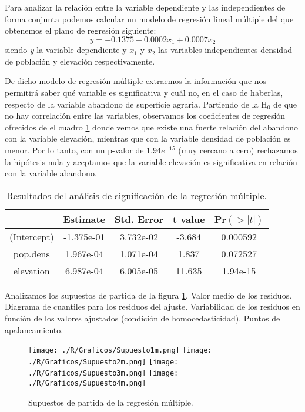 \documentclass[11pt,a4paper]{article}
\begin{document}
Para analizar la relación entre la variable dependiente y las independientes de forma conjunta podemos calcular un modelo de regresión lineal múltiple del que obtenemos el plano de regresión siguiente:
\begin{equation}
y=-0.1375+0.0002x_{1}+0.0007x_{2}
\label{eq:regre.multi}
\end{equation}
\noindent siendo \textit{y} la variable dependiente y $x_{1}$ y $x_2$ las variables independientes densidad de población y elevación respectivamente.

De dicho modelo de regresión múltiple extraemos la información que nos permitirá saber qué variable es significativa y cuál no, en el caso de haberlas, respecto de la variable abandono de superficie agraria. Partiendo de la H$_0$ de que no hay correlación entre las variables, observamos los coeficientes de regresión ofrecidos de el cuadro \ref{tab:coef.multi} donde vemos que existe una fuerte relación del abandono con la variable elevación, mientras que con la variable densidad de población es menor. Por lo tanto, con un p-valor de $1.94e^{-15}$ (muy cercano a cero) rechazamos la hipótesis nula y aceptamos que la variable elevación es significativa en relación con la variable abandono.

\begin{table}[ht]
\centering
\begin{tabular}{ccccc}
\toprule[0.4mm]
& Estimate & Std. Error & t value & Pr$(>|t|)$\\
\midrule
(Intercept) & -1.375e-01 & 3.732e-02 & -3.684 & 0.000592\\
pop.dens & 1.967e-04 & 1.071e-04 & 1.837 & 0.072527\\
elevation & 6.987e-04 & 6.005e-05 & 11.635 & 1.94e-15\\
\bottomrule[0.4mm]
\end{tabular}
\caption{Resultados del análisis de significación de la regresión múltiple.}
\label{tab:coef.multi}
\end{table}

Analizamos los supuestos de partida de la figura \ref{fig:sup.part}. Valor medio de los residuos. Diagrama de cuantiles para los residuos del ajuste. Variabilidad de los residuos en función de los valores ajustados (condición de homocedasticidad). Puntos de apalancamiento.

\begin{figure}
\centering
\texttt{[image: ./R/Graficos/Supuesto1m.png]}
\texttt{[image: ./R/Graficos/Supuesto2m.png]}
\texttt{[image: ./R/Graficos/Supuesto3m.png]}
\texttt{[image: ./R/Graficos/Supuesto4m.png]}
\caption{Supuestos de partida de la regresión múltiple.}
\label{fig:sup.part}
\end{figure}
\end{document}
